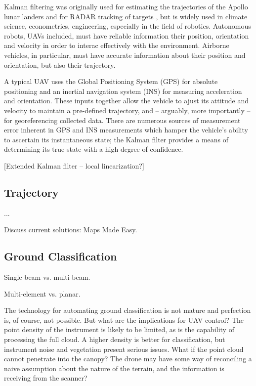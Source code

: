 \documentclass[10pt,a4paper]{report}
\begin{document}
Kalman filtering was originally used for estimating the trajectories of the Apollo lunar landers and for RADAR tracking of targets \cite{Grewal2010}, but is widely used in climate science, econometrics, engineering, especially in the field of robotics. Autonomous robots, UAVs included, must have reliable information their position, orientation and velocity in order to interac effectively with the environment. Airborne vehicles, in particular, must have accurate information about their position and orientation, but also their trajectory.

A typical UAV uses the Global Positioning System (GPS) for absolute positioning and an inertial navigation system (INS) for measuring acceleration and orientation. These inputs together allow the vehicle to ajust its attitude and velocity to maintain a pre-defined trajectory, and -- arguably, more importantly -- for georeferencing collected data. There are numerous sources of measurement error inherent in GPS and INS measurements which hamper the vehicle's ability to ascertain its instantaneous state; the Kalman filter provides a means of determining its true state with a high degree of confidence.

[Extended Kalman filter -- local linearization?]

\subsection{Trajectory}

...

Discuss current solutions: Maps Made Easy.



\subsection{Ground Classification}

Single-beam vs. multi-beam.

Multi-element vs. planar. \cite{Nobili2015}

The technology for automating ground classification is not mature \cite{Vosselman2001,Vosselman2000} and perfection is, of course, not possible. But what are the implications for UAV control? The point density of the instrument is likely to be limited, as is the capability of processing the full cloud. A higher density is better for classification, but instrument noise and vegetation present serious issues. What if the point cloud cannot penetrate into the canopy? The drone may have some way of reconciling a naive assumption about the nature of the terrain, and the information is receiving from the scanner?
\end{document}
